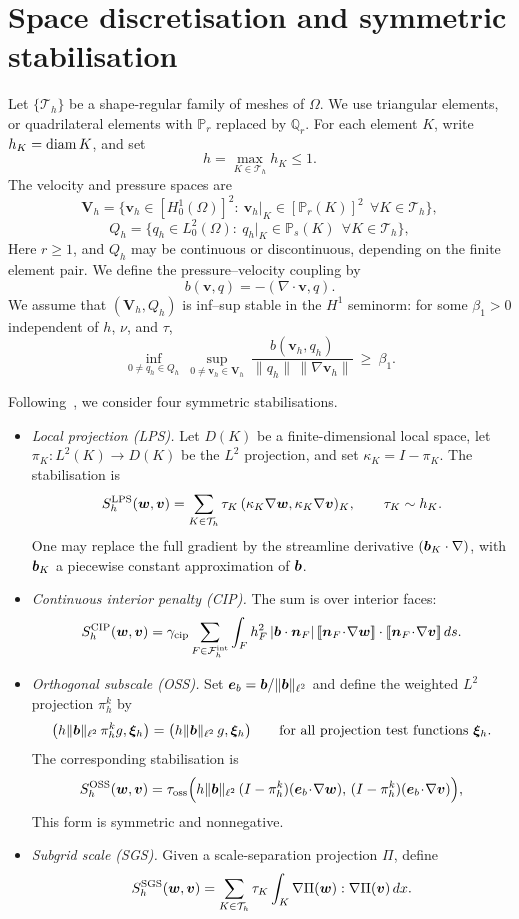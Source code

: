 \section{Space discretisation and symmetric stabilisation}\label{sec:space}
Let $\{\mathcal T_h\}$ be a shape-regular family of meshes of $\Omega$. We use triangular elements, or quadrilateral elements with $\mathbb P_r$ replaced by $\mathbb Q_r$. For each element $K$, write $h_K=\operatorname{diam} K$, and set
\[
h=\max_{K\in\mathcal T_h}h_K\le1 .
\]
The velocity and pressure spaces are
\[
\bm V_h=\bigl\{\bm v_h\in[H^1_0(\Omega)]^2:\ \bm v_h|_K\in[\mathbb P_r(K)]^2\ \ \forall K\in\mathcal T_h\bigr\},
\]
\[
Q_h=\bigl\{q_h\in L^2_0(\Omega):\ q_h|_K\in\mathbb P_s(K)\ \ \forall K\in\mathcal T_h\bigr\},
\]
Here $r\ge1$, and $Q_h$ may be continuous or discontinuous, depending on the finite element pair. We define the pressure--velocity coupling by
\[
b(\bm v,q)=-(\nabla\!\cdot\bm v,q).
\]
We assume that $(\bm V_h,Q_h)$ is inf--sup stable in the $H^1$ seminorm: for some $\beta_1>0$ independent of $h$, $\nu$, and $\tau$,
\begin{equation}\label{eq:infsup}
\inf_{0\ne q_h\in Q_h}\ \sup_{0\ne\bm v_h\in\bm V_h}\ \frac{b(\bm v_h,q_h)}{\|q_h\|\,\|\nabla\bm v_h\|}\ \ge\ \beta_1 .
\end{equation}

Following~\cite{AKJ}, we consider four symmetric stabilisations.
\begin{itemize}
\item \emph{Local projection (LPS).} Let $D(K)$ be a finite-dimensional local space, let $\pi_K:L^2(K)\to D(K)$ be the $L^2$ projection, and set $\kappa_K=I-\pi_K$. The stabilisation is
\[
S_h^{\rm LPS}(\bm w,\bm v)=\sum_{K\in\mathcal T_h}\tau_K\,(\kappa_K\nabla\bm w,\kappa_K\nabla\bm v)_K,\qquad \tau_K\sim h_K .
\]
One may replace the full gradient by the streamline derivative $(\boldsymbol b_K\cdot\nabla)$, with $\boldsymbol b_K$ a piecewise constant approximation of $\boldsymbol b$.
\item \emph{Continuous interior penalty (CIP).} The sum is over interior faces:
\[
S_h^{\rm CIP}(\bm w,\bm v)=\gamma_{\rm cip}\sum_{F\in\mathcal F_h^{\rm int}}\int_Fh_F^2\,|\bmb\cdot\bm n_F|\,[\![\bm n_F\!\cdot\!\nabla\bm w]\!]\cdot[\![\bm n_F\!\cdot\!\nabla\bm v]\!]\,ds .
\]
\item \emph{Orthogonal subscale (OSS).} Set $\bm e_b=\boldsymbol b/\|\boldsymbol b\|_{\ell^2}$ and define the weighted $L^2$ projection $\pi_h^k$ by
\[
\bigl(h\|\boldsymbol b\|_{\ell^2}\,\pi_h^kg,\bm\xi_h\bigr)=\bigl(h\|\boldsymbol b\|_{\ell^2}\,g,\bm\xi_h\bigr)\qquad\text{for all projection test functions }\bm\xi_h .
\]
The corresponding stabilisation is
\[
S_h^{\rm OSS}(\bm w,\bm v)=\tau_{\rm oss}\Bigl(h\|\boldsymbol b\|_{\ell^2}\,(I-\pi_h^k)(\bm e_b\!\cdot\!\nabla\bm w),\,(I-\pi_h^k)(\bm e_b\!\cdot\!\nabla\bm v)\Bigr),
\]
This form is symmetric and nonnegative.
\item \emph{Subgrid scale (SGS).} Given a scale-separation projection $\Pi$, define
\[
S_h^{\rm SGS}(\bm w,\bm v)=\sum_{K\in\mathcal T_h}\tau_K\int_K\nabla\Pi(\bm w):\nabla\Pi(\bm v)\,dx .
\]
\end{itemize}


